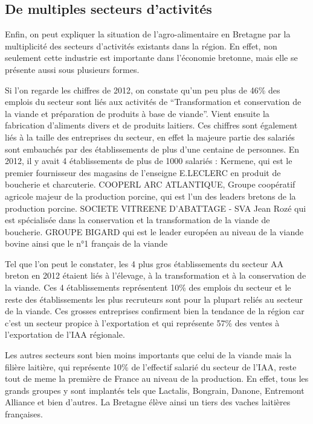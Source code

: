 \documentclass[a4paper,10pt]{report}
\begin{document}
		\subsection{De multiples secteurs d'activités}
			Enfin, on peut expliquer la situation de l'agro-alimentaire en Bretagne par la multiplicité des secteurs d'activités existants dans la région. En effet, non seulement cette industrie est importante dans l'économie bretonne, mais elle se présente aussi sous plusieurs formes.
			
			
			Si l’on regarde les chiffres de 2012, on constate qu’un peu plus de 46\% des emplois du secteur sont liés aux activités de  “Transformation et conservation de la viande et préparation de produits à base de viande”. Vient ensuite la fabrication d’aliments divers et de produits laitiers. Ces chiffres sont également liés à la taille des entreprises du secteur, en effet la majeure partie des salariés sont embauchés par des établissements de plus d’une centaine de personnes. En 2012, il y avait 4 établissements de plus de 1000 salariés :
			Kermene, qui est le premier fournisseur des magasins de l’enseigne E.LECLERC en produit de boucherie et charcuterie.
			COOPERL ARC ATLANTIQUE, Groupe coopératif agricole majeur de la production porcine, qui est l’un des leaders bretons de la production porcine.
			SOCIETE VITREENE D’ABATTAGE - SVA Jean Rozé qui est spécialisée dans la conservation et la transformation de la viande de boucherie.
			GROUPE BIGARD qui est le leader européen au niveau de la viande bovine ainsi que le n°1 français de la viande\cite{BigardPremierTransformateurViande}
			
			Tel que l’on peut le constater, les 4 plus gros établissements du secteur AA breton en 2012 étaient liés à l’élevage, à la transformation et à la conservation de la viande. Ces 4 établissements représentent 10\% des emplois du secteur et le reste des établissements les plus recruteurs sont pour la plupart reliés au secteur de la viande. Ces grosses entreprises confirment bien la tendance de la région car c’est un secteur propice à l’exportation et qui représente 57\% des ventes à l’exportation de l’IAA régionale.
			
			Les autres secteurs sont bien moins importants que celui de la viande mais la filière laitière, qui représente 10\% de l’effectif salarié du secteur de l’IAA, reste tout de meme la première de France au niveau de la production. En effet, tous les grands groupes y sont implantés tels que Lactalis, Bongrain, Danone, Entremont Alliance et bien d’autres\cite{ProduitsLaitiersRegionBretagne}. La Bretagne élève ainsi un tiers des vaches laitières françaises.
			
\end{document}
